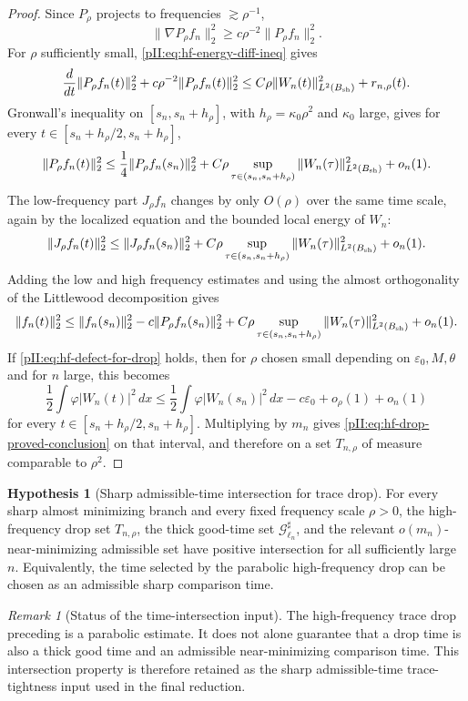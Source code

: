 \documentclass[11pt]{article}
\numberwithin{equation}{section}
\theoremstyle{plain}
\theoremstyle{definition}
\newtheorem{hypothesis}{Hypothesis}[section]
\theoremstyle{remark}
\newtheorem{remark}{Remark}[section]
\newcommand{\dx}{\,dx}
\begin{document}
\begin{proof}
Since $P_\rho$ projects to frequencies $\gtrsim\rho^{-1}$,
\[
        \|\nabla P_\rho f_n\|_2^2
        \ge c\rho^{-2}\|P_\rho f_n\|_2^2.
\]
For $\rho$ sufficiently small, \eqref{pII:eq:hf-energy-diff-ineq} gives
\[
        \frac{d}{dt}\|P_\rho f_n(t)\|_2^2
        +c\rho^{-2}\|P_\rho f_n(t)\|_2^2
        \le C\rho\|W_n(t)\|_{L^2(B_{\rm sh})}^2+r_{n,\rho}(t).
\]
Gronwall's inequality on $[s_n,s_n+h_\rho]$, with $h_\rho=\kappa_0\rho^2$ and $\kappa_0$ large, gives for every $t\in[s_n+h_\rho/2,s_n+h_\rho]$,
\[
        \|P_\rho f_n(t)\|_2^2
        \le \frac14\|P_\rho f_n(s_n)\|_2^2
        +C\rho\sup_{\tau\in(s_n,s_n+h_\rho)}\|W_n(\tau)\|_{L^2(B_{\rm sh})}^2
        +o_n(1).
\]
The low-frequency part $J_\rho f_n$ changes by only $O(\rho)$ over the same time scale, again by the localized equation and the bounded local energy of $W_n$:
\[
        \|J_\rho f_n(t)\|_2^2
        \le \|J_\rho f_n(s_n)\|_2^2
        +C\rho\sup_{\tau\in(s_n,s_n+h_\rho)}\|W_n(\tau)\|_{L^2(B_{\rm sh})}^2
        +o_n(1).
\]
Adding the low and high frequency estimates and using the almost orthogonality of the Littlewood decomposition gives
\[
        \|f_n(t)\|_2^2
        \le \|f_n(s_n)\|_2^2
        -c\|P_\rho f_n(s_n)\|_2^2
        +C\rho\sup_{\tau\in(s_n,s_n+h_\rho)}\|W_n(\tau)\|_{L^2(B_{\rm sh})}^2
        +o_n(1).
\]
If \eqref{pII:eq:hf-defect-for-drop} holds, then for $\rho$ chosen small depending on $\varepsilon_0,M,\theta$ and for $n$ large, this becomes
\[
        \frac12\int\varphi|W_n(t)|^2\dx
        \le
        \frac12\int\varphi|W_n(s_n)|^2\dx
        -c\varepsilon_0+o_\rho(1)+o_n(1)
\]
for every $t\in[s_n+h_\rho/2,s_n+h_\rho]$.  Multiplying by $m_n$ gives \eqref{pII:eq:hf-drop-proved-conclusion} on that interval, and therefore on a set $T_{n,\rho}$ of measure comparable to $\rho^2$.
\end{proof}

\begin{hypothesis}[Sharp admissible-time intersection for trace drop]\label{pII:hyp:sharp-time-intersection}
For every sharp almost minimizing branch and every fixed frequency scale \(\rho>0\), the high-frequency drop set \(T_{n,\rho}\), the thick good-time set \(\mathcal G^\sharp_{\ell_n}\), and the relevant \(o(m_n)\)-near-minimizing admissible set have positive intersection for all sufficiently large \(n\).  Equivalently, the time selected by the parabolic high-frequency drop can be chosen as an admissible sharp comparison time.
\end{hypothesis}

\begin{remark}[Status of the time-intersection input]\label{pII:rem:time-intersection-status}
The high-frequency trace drop preceding  is a parabolic estimate.  It does not alone guarantee that a drop time is also a thick good time and an admissible near-minimizing comparison time.  This intersection property is therefore retained as the sharp admissible-time trace-tightness input used in the final reduction.
\end{remark}
\end{document}
